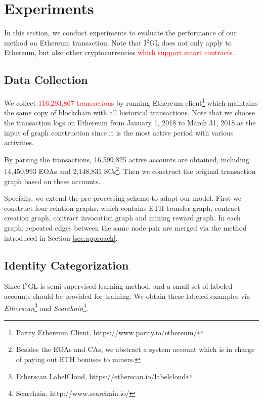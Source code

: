 
\section{Experiments}
\label{sec:experiments}
In this section, we conduct experiments to evaluate the performance of our method on Ethereum transaction. Note that I$^2$GL does not only apply to Ethereum, but also other cryptocurrencies \textcolor{red}{which support smart contracts.}

\subsection{Data Collection}
We collect \textcolor{red}{116,293,867 transactions} by running Ethereum client\footnote{Parity Ethereum Client, https://www.parity.io/ethereum/} which maintains the same copy of blockchain with all historical transactions. Note that we choose the transaction logs on Ethereum from January 1, 2018 to March 31, 2018 as the input of graph construction since it is the most active period with various activities.

By parsing the transactions, 16,599,825 active accounts are obtained, including 14,450,993 EOAs and 2,148,831 SCs\footnote{Besides the EOAs and CAs, we abstract a system account which is in charge of paying out ETH bonuses to miners.}. Then we construct the original transaction graph based on these accounts.

Specially, we extend the pre-processing scheme to adapt our model. First we construct four relation graphs, which contains ETH transfer graph, contract creation graph, contract invocation graph and mining reward graph. In each graph, repeated edges between the same node pair are merged via the method introduced in Section \ref{sec:approach}.


\subsection{Identity Categorization}
Since I$^2$GL is semi-supervised learning method, and a small set of labeled accounts should be provided for training. We obtain these labeled examples via \emph{Etherscan}\footnote{Etherscan LabelCloud, https://etherscan.io/labelcloud} and \emph{Searchain}\footnote{Searchain, http://www.searchain.io/}.

